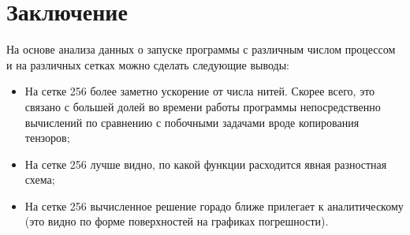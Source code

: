 \documentclass[a4paper,hidelinks,12pt]{article}
\begin{document}
\newpage
\section{Заключение}

На основе анализа данных о запуске программы с различным числом процессом и на различных сетках можно сделать следующие выводы:

\begin{itemize}
    \item На сетке 256 более заметно ускорение от числа нитей. Скорее всего, это связано с большей долей во времени работы программы непосредственно вычислений по сравнению с побочными задачами вроде копирования тензоров;

    \item На сетке 256 лучше видно, по какой функции расходится явная разностная схема;

    \item На сетке 256 вычисленное решение горадо ближе прилегает к аналитическому (это видно по форме поверхностей на графиках погрешности).
\end{itemize}
    
\end{document}

